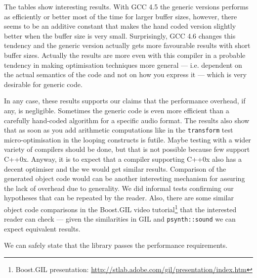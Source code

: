 The tables show interesting results. With GCC 4.5 the generic versions
performs as efficiently or better most of the time for larger buffer
sizes, however, there seems to be an additive constant that makes the
hand coded version slightly better when the buffer size is very
small. Surprisingly, GCC 4.6 changes this tendency and the generic
version actually gets more favourable results with short buffer
sizes. Actually the results are more even with this compiler in a
probable tendency in making optimisation techniques more general ---
i.e. dependent on the actual semantics of the code and not on
how you express it --- which is very desirable for generic code.

In any case, these results supports our claims that the performance
overhead, if any, is negligible. Sometimes the generic code is even
more efficient than a carefully hand-coded algorithm for a specific
audio format. The results also show that as soon as you add arithmetic
computations like in the \texttt{transform} test micro-optimisation in
the looping constructs is futile. Maybe testing with a wider variety
of compilers should be done, but that is not possible because few
support C++0x. Anyway, it is to expect that a compiler supporting
C++0x also has a decent optimiser and the we would get similar
results. Comparison of the generated object code would can be another
interesting mechanism for assuring the lack of overhead due to
generality. We did informal tests confirming our hypotheses that can
be repeated by the reader. Also, there are some similar object code
comparisons in the Boost.GIL video tutorial\footnote{Boost.GIL
  presentation:
  \url{http://stlab.adobe.com/gil/presentation/index.htm}} that the
interested reader can check --- given the similarities in GIL and
\texttt{psynth::sound} we can expect equivalent results.

We can safely state that the library passes the performance
requirements.

